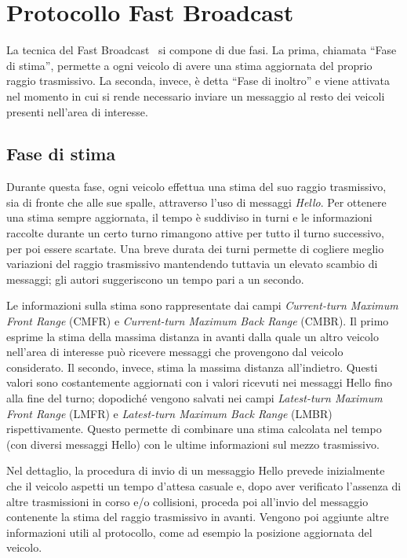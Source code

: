 
\chapter{Protocollo Fast Broadcast}\label{chap:protocollo-fast-broadcast}
La tecnica del Fast Broadcast~\cite{Palazzi07howdo} si compone di due fasi. La prima, chiamata ``Fase di stima'', permette a ogni veicolo di avere una stima aggiornata
del proprio raggio trasmissivo.
La seconda, invece, è detta ``Fase di inoltro'' e viene attivata nel momento in cui si rende necessario inviare un messaggio
al resto dei veicoli presenti nell'area di interesse.
%
\section{Fase di stima}\label{sec:fb-fase-di-stima}
Durante questa fase, ogni veicolo effettua una stima del suo raggio trasmissivo, sia di fronte che alle sue spalle, attraverso l'uso di messaggi \textit{Hello}.
Per ottenere una stima sempre aggiornata, il tempo è suddiviso in turni e le informazioni raccolte durante un certo turno
rimangono attive per tutto il turno successivo, per poi essere scartate.
Una breve durata dei turni permette di cogliere meglio variazioni del raggio trasmissivo mantendendo tuttavia un elevato scambio di messaggi;
gli autori suggeriscono un tempo pari a un secondo.

Le informazioni sulla stima sono rappresentate dai campi \textit{Current-turn Maximum Front Range} (CMFR) e \textit{Current-turn Maximum Back Range} (CMBR).
Il primo esprime la stima della massima distanza in avanti dalla quale un altro veicolo nell'area di interesse può ricevere messaggi che provengono dal veicolo considerato.
Il secondo, invece, stima la massima distanza all'indietro.
Questi valori sono costantemente aggiornati con i valori ricevuti nei messaggi Hello fino alla fine del turno;
dopodiché vengono salvati nei campi \textit{Latest-turn Maximum Front Range} (LMFR) e \textit{Latest-turn Maximum Back Range} (LMBR) rispettivamente.
Questo permette di combinare una stima calcolata nel tempo (con diversi messaggi Hello) con le ultime informazioni sul mezzo trasmissivo.

Nel dettaglio, la procedura di invio di un messaggio Hello prevede inizialmente che il veicolo aspetti un tempo d'attesa casuale e,
dopo aver verificato l'assenza di altre trasmissioni in corso e/o collisioni, proceda poi all'invio del messaggio contenente
la stima del raggio trasmissivo in avanti.
Vengono poi aggiunte altre informazioni utili al protocollo, come ad esempio la posizione aggiornata del veicolo.

